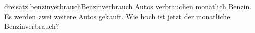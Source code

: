 \begin{exercise}{dreisatz.benzinverbrauch}{Benzinverbrauch}
  \ifproblem{} Autos verbrauchen monatlich  Benzin. Es werden zwei weitere Autos
    gekauft. Wie hoch ist jetzt der monatliche Benzinverbrauch?
  \fi
\end{exercise}
